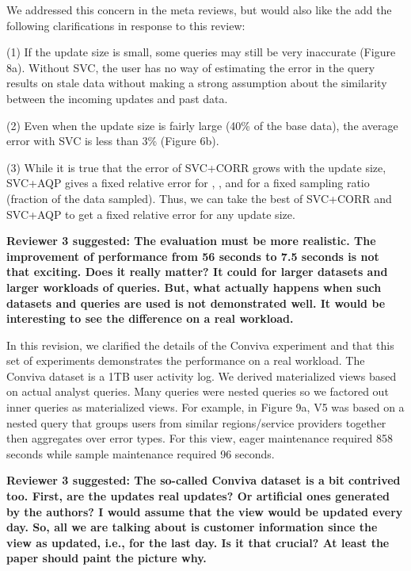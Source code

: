 We addressed this concern in the meta reviews, but would also like the add the following clarifications in response to this review:

\noindent  (1) If the update size is small, some queries may still be very inaccurate (Figure 8a). Without SVC, the user has no way of estimating the error in the query results on stale data without making a strong assumption about the similarity between the incoming updates and past data. 

\noindent (2) Even when the update size is fairly large (40\% of the base data), the average error with SVC is less than 3\% (Figure 6b).

\noindent (3) While it is true that the error of SVC+CORR grows with the update size, SVC+AQP gives a fixed relative error for \sumfunc, \countfunc, and \avgfunc for a fixed sampling ratio (fraction of the data sampled). Thus, we can take the best of SVC+CORR and SVC+AQP to get a fixed relative error for any update size. 


\vspace{1.5em}

\textbf{Reviewer 3 suggested: The evaluation must be more realistic. The improvement of performance from 56 seconds to 7.5 seconds is not that exciting. Does it really matter? It could for larger datasets and larger workloads of queries. But, what actually happens when such datasets and queries are used is not demonstrated well. It would be interesting to see the difference on a real workload.}


In this revision, we clarified the details of the Conviva experiment and that this set of experiments demonstrates the performance on a real workload. The Conviva dataset is a 1TB user activity log. We derived materialized views based on actual analyst queries. Many queries were nested queries so we factored out inner queries as materialized views. For example, in Figure 9a, V5 was based on a nested query that groups users from similar regions/service providers together then aggregates over error types. For this view, eager maintenance required 858 seconds while sample maintenance required 96 seconds. 

\vspace{1.5em}

\textbf{Reviewer 3 suggested: The so-called Conviva dataset is a bit contrived too. First, are the updates real updates? Or artificial ones generated by the authors? I would assume that the view would be updated every day. So, all we are talking about is customer information since the view as updated, i.e., for the last day. Is it that crucial? At least the paper should paint the picture why.}

